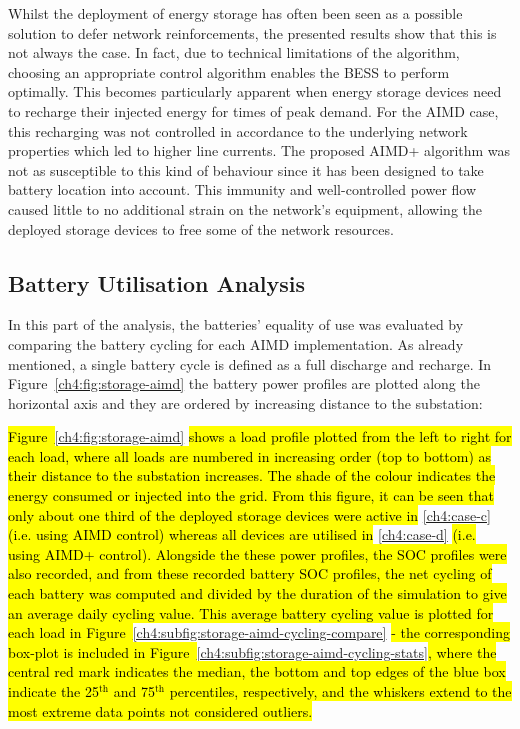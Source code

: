 Whilst the deployment of energy storage has often been seen as a possible solution to defer network reinforcements, the presented results show that this is not always the case.
In fact, due to technical limitations of the algorithm, choosing an appropriate control algorithm enables the BESS to perform optimally.
This becomes particularly apparent when energy storage devices need to recharge their injected energy for times of peak demand.
For the AIMD case, this recharging was not controlled in accordance to the underlying network properties which led to higher line currents.
The proposed AIMD+ algorithm was not as susceptible to this kind of behaviour since it has been designed to take battery location into account.
This immunity and well-controlled power flow caused little to no additional strain on the network's equipment, allowing the deployed storage devices to free some of the network resources.

\subsection{Battery Utilisation Analysis}

In this part of the analysis, the batteries' equality of use was evaluated by comparing the battery cycling for each AIMD implementation.
As already mentioned, a single battery cycle is defined as a full discharge and recharge.
In Figure~\ref{ch4:fig:storage-aimd} the battery power profiles are plotted along the horizontal axis and they are ordered by increasing distance to the substation:



\hl{Figure~}\ref{ch4:fig:storage-aimd}\hl{ shows a load profile plotted from the left to right for each load, where all loads are numbered in increasing order (top to bottom) as their distance to the substation increases.
The shade of the colour indicates the energy consumed or injected into the grid.
From this figure, it can be seen that only about one third of the deployed storage devices were active in }\ref{ch4:case-c}\hl{ (i.e. using AIMD control) whereas all devices are utilised in }\ref{ch4:case-d}\hl{ (i.e. using AIMD+ control).
Alongside the these power profiles, the SOC profiles were also recorded, and
from these recorded battery SOC profiles, the net cycling of each battery was computed and divided by the duration of the simulation to give an average daily cycling value.
This average battery cycling value is plotted for each load in Figure~}\ref{ch4:subfig:storage-aimd-cycling-compare}\hl{ - the corresponding box-plot is included in Figure~}\ref{ch4:subfig:storage-aimd-cycling-stats}\hl{, where the central red mark indicates the median, the bottom and top edges of the blue box indicate the 25$^\text{th}$ and 75$^\text{th}$ percentiles, respectively, and the whiskers extend to the most extreme data points not considered outliers.}

